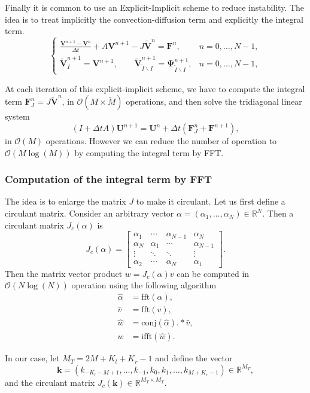 Finally it is common to use an Explicit-Implicit scheme to reduce instability. The idea is to treat implicitly the convection-diffusion term and explicitly the integral term.
$$\begin{cases}
\displaystyle{\frac{\mathbf{V}^{n+1}-\mathbf{V}^n}{\Delta t}+ A\mathbf{V}^{n+1}-J\mathbf{\tilde{V}}^n = \mathbf{F}^n},&n = 0,\ldots, N-1,\\
\mathbf{\tilde{V}}_I^{n+1} = \mathbf{V}^{n+1},\qquad \mathbf{\tilde{V}}_{\tilde{I}\backslash I}^{n+1}=\mathbf{\Psi}_{\tilde{I}\backslash I}^{n+1}, &n = 0,\ldots, N-1,
\end{cases}$$

At each iteration of this explicit-implicit scheme, we have to compute the integral term $\mathbf{F}^n_J = J\mathbf{\tilde{V}}^n$, in $\mathcal{O}(M\times \tilde{M})$ operations, and then solve the tridiagonal linear system
$$(I+\Delta t A)\mathbf{U}^{n+1} = \mathbf{U}^n +\Delta t\left(\mathbf{F}^n_J+\mathbf{F}^{n+1}\right),$$ 
in $\mathcal{O}(M)$ operations.
However we can reduce the number of operation to $\mathcal{O}(M\log(M))$ by computing the integral term by FFT.

\subsubsection{Computation of the integral term by FFT}
The idea is to enlarge the matrix $J$ to make it circulant. Let us first define a circulant matrix. Consider an arbitrary vector $\alpha = (\alpha_1, \ldots, \alpha_N) \in\mathbb{R}^N$. Then a circulant matrix $J_c(\alpha)$ is
$$J_c(\alpha)=\left[
\begin{matrix}
\alpha_1 & \cdots & \alpha_{N-1} & \alpha_N \\
\alpha_N & \alpha_1 & \cdots & \alpha_{N-1} \\
\vdots & \ddots & \ddots & \vdots \\
\alpha_2& \cdots & \alpha_N &\alpha_1
\end{matrix}
\right].$$
Then the matrix vector product $w = J_c(\alpha)v$ can be computed in $\mathcal{O}(N\log(N))$ operation using the following algorithm
\begin{align*}
\hat{\alpha}&=\text{fft}(\alpha),\\
\hat{v}&=\text{fft}(v),\\
\hat{w}&= \text{conj}(\hat{\alpha}).*\hat{v},\\
w &= \text{ifft}(\hat{w}).
\end{align*}

In our case, let $M_T = 2M+K_l+K_r-1$ and define the vector
$$\mathbf{k} = (k_{-K_l-M+1},\ldots,k_{-1},k_0,k_1,\ldots,k_{M+K_r-1})\in\mathbb{R}^{M_T},$$
and the circulant matrix $J_c(\mathbf{k})\in\mathbb{R}^{M_T\times M_T}$.

